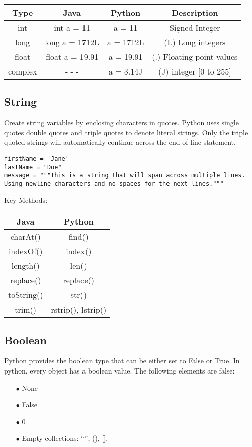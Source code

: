 \documentclass[a4paper,9pt]{extarticle}
\begin{document}
\begin{multicols*}{2}
\begin{center}
 \begin{tabular}{||c | c | c | c||}
 \hline
 Type & Java & Python & Description \\ [0.5ex]
 \hline\hline
 int & int a = 11 & a = 11 & Signed Integer\\
 \hline
 long & long a = 1712L & a = 1712L & (L) Long integers\\
 \hline
 float & float a = 19.91 & a = 19.91 &  (.) Floating point values\\
 \hline
 complex & - - - & a = 3.14J & (J) integer [0 to 255]\\
 \hline
\end{tabular}
\end{center}

\newpage
\subsection{String}
Create string variables by enclosing characters in quotes. Python uses single quotes  double quotes  and triple quotes  to denote literal strings. Only the triple quoted strings  will automatically continue across the end of line statement.

\begin{lstlisting}
firstName = 'Jane'
lastName = "Doe"
message = """This is a string that will span across multiple lines. Using newline characters and no spaces for the next lines."""
\end{lstlisting}

Key Methods:
\begin{center}
 \begin{tabular}{||c | c||}
 \hline
 Java & Python\\ [1ex]
 \hline\hline
 charAt() & find()\\
 \hline
 indexOf() & index()\\
 \hline
 length() & len()\\
 \hline
replace() & replace()\\
 \hline
 toString() & str()\\
 \hline
 trim() & rstrip(), lstrip()\\
 \hline
\end{tabular}
\end{center}

\subsection{Boolean}
Python provides the boolean type that can be either set to False or True.
In python, every object has a boolean value. The following elements are false:
\begin{itemize}
  \item[$\bullet$] None
  \item[$\bullet$] False
  \item[$\bullet$] 0
  \item[$\bullet$] Empty collections: “”, (), [], {}
\end{itemize}


\end{multicols*}
\end{document}
